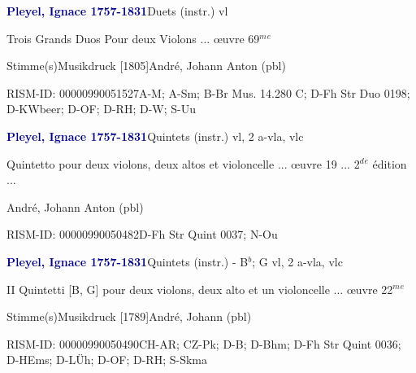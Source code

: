 \documentclass[twocolumn, 12pt]{book}
\begin{document}
\par \vspace{16pt} \textcolor{darkblue}{\textbf{Pleyel, Ignace  1757-1831}}\hfillplus{\textbf{[312]}}\newline Duets (instr.) vl
\par \begin{itshape}Trois Grands Duos Pour deux Violons ... œuvre 69$^m$$^e$\end{itshape} 
\par \textcolor{darkblue}{}  Stimme(s)\newline Musikdruck  [1805]\newline André, Johann Anton  (pbl)
\par RISM-ID: 00000990051527\newline A-M; A-Sm; B-Br  Mus. 14.280 C; D-Fh  Str Duo 0198; D-KWbeer; D-OF; D-RH; D-W; S-Uu
\par \vspace{16pt} \textcolor{darkblue}{\textbf{Pleyel, Ignace  1757-1831}}\hfillplus{\textbf{[313]}}\newline Quintets (instr.) vl, 2 a-vla, vlc
\par \begin{itshape}Quintetto pour deux violons, deux altos et violoncelle ... œuvre 19 ... 2$^d$$^e$ édition ...\end{itshape} \newline André, Johann Anton  (pbl)
\par RISM-ID: 00000990050482\newline D-Fh  Str Quint 0037; N-Ou
\par \vspace{16pt} \textcolor{darkblue}{\textbf{Pleyel, Ignace  1757-1831}}\hfillplus{\textbf{[314]}}\newline Quintets (instr.) - B$^b$; G vl, 2 a-vla, vlc
\par \begin{itshape}II Quintetti [B, G] pour deux violons, deux alto et un violoncelle ... œuvre 22$^m$$^e$\end{itshape} 
\par \textcolor{darkblue}{}  Stimme(s)\newline Musikdruck  [1789]\newline André, Johann  (pbl)
\par RISM-ID: 00000990050490\newline CH-AR; CZ-Pk; D-B; D-Bhm; D-Fh  Str Quint 0036; D-HEms; D-LÜh; D-OF; D-RH; S-Skma
\end{document}
